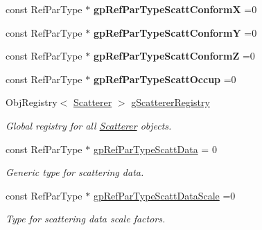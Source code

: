 \begin{DoxyCompactItemize}
\item 
\mbox{\label{namespace_obj_cryst_aa8faeba2cd94842a75179cb7932ea817}} 
const Ref\+Par\+Type $\ast$ {\bfseries gp\+Ref\+Par\+Type\+Scatt\+ConformX} =0
\item 
\mbox{\label{namespace_obj_cryst_acb8f1aa092f25b02b3d01cd6977655a3}} 
const Ref\+Par\+Type $\ast$ {\bfseries gp\+Ref\+Par\+Type\+Scatt\+ConformY} =0
\item 
\mbox{\label{namespace_obj_cryst_a159ec646bc5cf2d98602c05f68d6a7bd}} 
const Ref\+Par\+Type $\ast$ {\bfseries gp\+Ref\+Par\+Type\+Scatt\+ConformZ} =0
\item 
\mbox{\label{namespace_obj_cryst_a4cdac3bd11e548fb42fad284e59d568f}} 
const Ref\+Par\+Type $\ast$ {\bfseries gp\+Ref\+Par\+Type\+Scatt\+Occup} =0
\item 
\mbox{\label{namespace_obj_cryst_abbb707441f0fa4a0143a841b12d9ed24}} 
Obj\+Registry$<$ \mbox{\hyperlink{class_obj_cryst_1_1_scatterer}{Scatterer}} $>$ \mbox{\hyperlink{namespace_obj_cryst_abbb707441f0fa4a0143a841b12d9ed24}{g\+Scatterer\+Registry}}
\begin{DoxyCompactList}\small\item\em Global registry for all \mbox{\hyperlink{class_obj_cryst_1_1_scatterer}{Scatterer}} objects. \end{DoxyCompactList}\item 
\mbox{\label{namespace_obj_cryst_aeb7d5ecda63349d267efd498dc71f7f9}} 
const Ref\+Par\+Type $\ast$ \mbox{\hyperlink{namespace_obj_cryst_aeb7d5ecda63349d267efd498dc71f7f9}{gp\+Ref\+Par\+Type\+Scatt\+Data}} = 0
\begin{DoxyCompactList}\small\item\em Generic type for scattering data. \end{DoxyCompactList}\item 
\mbox{\label{namespace_obj_cryst_a11bf86df162c0a3a9b5a7fbbaa686e8f}} 
const Ref\+Par\+Type $\ast$ \mbox{\hyperlink{namespace_obj_cryst_a11bf86df162c0a3a9b5a7fbbaa686e8f}{gp\+Ref\+Par\+Type\+Scatt\+Data\+Scale}} =0
\begin{DoxyCompactList}\small\item\em Type for scattering data scale factors. \end{DoxyCompactList}\item 

\end{DoxyCompactItemize}
